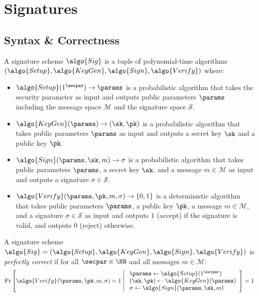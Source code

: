 \section{Signatures}\label{sec:signatures}

\subsection{Syntax \& Correctness}

\begin{definition}
  A signature scheme $\algo{Sig}$ is a tuple of polynomial-time algorithms $(\algo{Setup}, \algo{KeyGen}, \algo{Sign}, \algo{Verify})$ where:
  \begin{itemize}
    \item $\algo{Setup}(1^\secpar) \rightarrow \params$ is a probabilistic algorithm that takes the security parameter as input and outputs public parameters $\params$ including the message space $\mathcal{M}$ and the signature space $\mathcal{S}$.
    \item $\algo{KeyGen}(\params) \rightarrow (\sk, \pk)$ is a probabilistic algorithm that takes public parameters $\params$ as input and outputs a secret key $\sk$ and a public key $\pk$.
    \item $\algo{Sign}(\params, \sk, m) \rightarrow \sigma$ is a probabilistic algorithm that takes public parameters $\params$, a secret key $\sk$, and a message $m \in \mathcal{M}$ as input and outputs a signature $\sigma \in \mathcal{S}$.
    \item $\algo{Verify}(\params, \pk, m, \sigma) \rightarrow \{0, 1\}$ is a deterministic algorithm that takes public parameters $\params$, a public key $\pk$, a message $m \in \mathcal{M}$, and a signature $\sigma \in \mathcal{S}$ as input and outputs $1$ (accept) if the signature is valid, and outputs $0$ (reject) otherwise.
  \end{itemize}
\end{definition}

\begin{definition}[Correctness]\label{def:sig-correctness}
  A signature scheme $\algo{Sig} = (\algo{Setup}, \algo{KeyGen}, \algo{Sign}, \algo{Verify})$ is \emph{perfectly correct} if for all $\secpar \in \NN$ and all messages $m \in \mathcal{M}$:
  \[
    \Pr\left[\algo{Verify}(\params, \pk, m, \sigma) = 1 \;\middle|\; \begin{array}{l}
      \params \gets \algo{Setup}(1^\secpar) \\
      (\sk, \pk) \gets \algo{KeyGen}(\params) \\
      \sigma \gets \algo{Sign}(\params, \sk, m)
    \end{array}\right] = 1
  \]
\end{definition}

